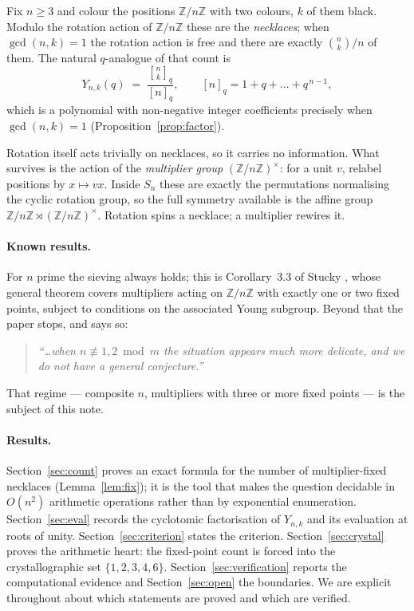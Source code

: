 \documentclass[11pt,a4paper]{article}
\theoremstyle{plain}
\theoremstyle{definition}
\theoremstyle{remark}
\newcommand{\Z}{\mathbb{Z}}
\newcommand{\Zn}{\Z/n\Z}
\newcommand{\units}[1]{(\Z/#1\Z)^{\times}}
\newcommand{\qint}[1]{[#1]_q}
\newcommand{\qbin}[2]{\genfrac[]{0pt}{}{#1}{#2}_{q}}
\begin{document}
Fix $n\ge 3$ and colour the positions $\Zn$ with two colours, $k$ of them black. Modulo the
rotation action of $\Zn$ these are the \emph{necklaces}; when $\gcd(n,k)=1$ the rotation
action is free and there are exactly $\binom{n}{k}/n$ of them. The natural $q$-analogue of
that count is
\begin{equation}\label{eq:Y}
  Y_{n,k}(q)\;=\;\frac{\qbin{n}{k}}{\qint{n}},
  \qquad \qint{n}=1+q+\dots+q^{\,n-1},
\end{equation}
which is a polynomial with non-negative integer coefficients precisely when $\gcd(n,k)=1$
(Proposition~\ref{prop:factor}).

Rotation itself acts trivially on necklaces, so it carries no information. What survives is
the action of the \emph{multiplier group} $\units{n}$: for a unit $v$, relabel positions by
$x\mapsto vx$. Inside $S_n$ these are exactly the permutations normalising the cyclic
rotation group, so the full symmetry available is the affine group
$\Zn\rtimes\units{n}$. Rotation spins a necklace; a multiplier rewires it.

\paragraph{Known results.}
For $n$ prime the sieving always holds; this is Corollary~3.3 of Stucky \cite{stucky},
whose general theorem covers multipliers acting on $\Zn$ with exactly one or two fixed
points, subject to conditions on the associated Young subgroup. Beyond that the paper
stops, and says so:
\begin{quote}
\emph{``\dots when $n\not\equiv 1,2 \bmod m$ the situation appears much more delicate, and we
do not have a general conjecture.''} \cite[\S3]{stucky}
\end{quote}
That regime --- composite $n$, multipliers with three or more fixed points --- is the
subject of this note.

\paragraph{Results.}
Section~\ref{sec:count} proves an exact formula for the number of multiplier-fixed
necklaces (Lemma~\ref{lem:fix}); it is the tool that makes the question decidable in
$O(n^2)$ arithmetic operations rather than by exponential enumeration.
Section~\ref{sec:eval} records the cyclotomic factorisation of $Y_{n,k}$ and its evaluation
at roots of unity. Section~\ref{sec:criterion} states the criterion.
Section~\ref{sec:crystal} proves the arithmetic heart: the fixed-point count is forced into
the crystallographic set $\{1,2,3,4,6\}$. Section~\ref{sec:verification} reports the
computational evidence and Section~\ref{sec:open} the boundaries. We are explicit
throughout about which statements are proved and which are verified.
\end{document}
